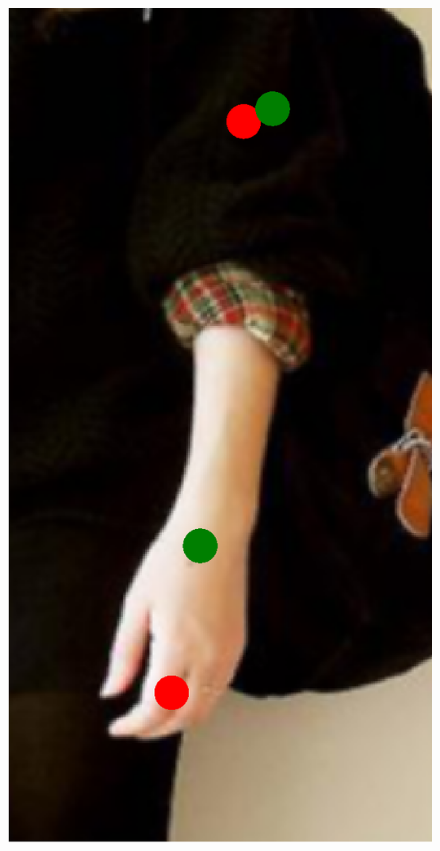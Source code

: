 \begin{figure}[!t]
    \includegraphics[height=\fh]{resources/Fixing/fix_7}
    \hfill

\end{figure}
